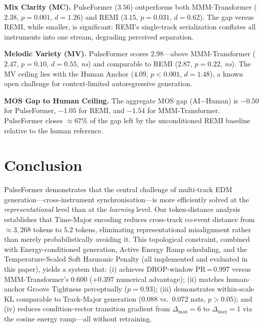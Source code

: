 \documentclass[conference]{IEEEtran}
\begin{document}
\textbf{Mix Clarity (MC).} PulseFormer ($3.56$) outperforms both MMM-Transformer ($2.38$, $p=0.001$, $d=1.26$) and REMI ($3.15$, $p=0.031$, $d=0.62$). The gap versus REMI, while smaller, is significant: REMI's single-track serialization conflates all instruments into one stream, degrading perceived separation.

\textbf{Melodic Variety (MV).} PulseFormer scores $2.98$—above MMM-Transformer ($2.47$, $p=0.10$, $d=0.55$, \textit{ns}) and comparable to REMI ($2.87$, $p=0.22$, \textit{ns}). The MV ceiling lies with the Human Anchor ($4.09$, $p<0.001$, $d=1.48$), a known open challenge for context-limited autoregressive generation.

\textbf{MOS Gap to Human Ceiling.} The aggregate MOS gap (AI$-$Human) is $-0.50$ for PulseFormer, $-1.05$ for REMI, and $-1.54$ for MMM-Transformer. PulseFormer closes $\approx 67\%$ of the gap left by the unconditioned REMI baseline relative to the human reference.


\section{Conclusion}
\label{sec:conclusion}
PulseFormer demonstrates that the central challenge of multi-track EDM
generation---cross-instrument synchronisation---is more efficiently solved
at the \textit{representational} level than at the \textit{learning} level.
Our token-distance analysis establishes that Time-Major encoding reduces
cross-track co-event distance from $\approx\!3{,}268$ tokens to $5.2$
tokens, eliminating representational misalignment rather than merely
probabilistically avoiding it. This topological constraint, combined with
Energy-conditioned generation, Active Energy Ramp scheduling, and the
Temperature-Scaled Soft Harmonic Penalty (all implemented and evaluated
in this paper), yields a system that: (i) achieves DROP-window
PR\,=\,0.997 versus MMM-Transformer's 0.600 (+0.397 numerical advantage);
(ii) matches human-anchor Groove Tightness perceptually ($p=0.93$);
(iii) demonstrates within-scale KL comparable to Track-Major generation
(0.088 vs.\ 0.072 nats, $p>0.05$); and (iv) reduces condition-vector
transition gradient from $\Delta_{\max}=6$ to $\Delta_{\max}=1$ via the
cosine energy ramp---all without retraining.
\end{document}
